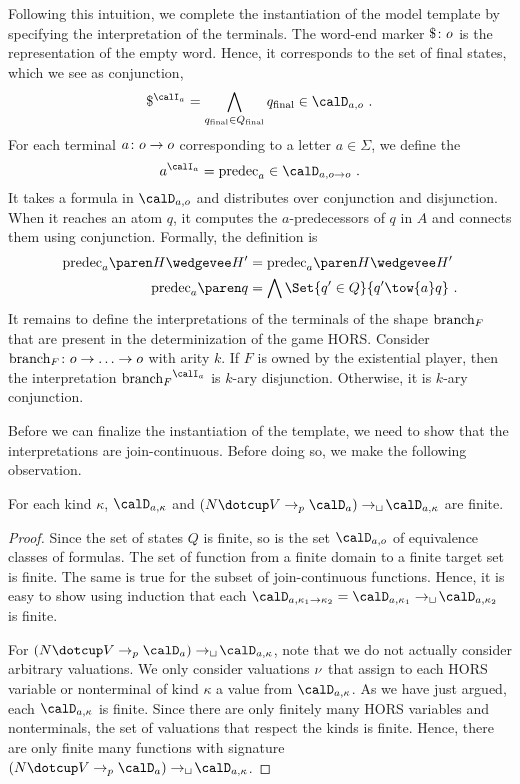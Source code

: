 \documentclass[../../diss.tex]{subfiles}
\begin{document}
Following this intuition, we complete the instantiation of the model template by specifying the interpretation of the terminals.
The word-end marker $\$ \colon o$ is the representation of the empty word.
Hence, it corresponds to the set of final states, which we see as conjunction,
\[
    \wordend^{\interpretationa} = \bigwedge_{\qfinal \in \QF} \qfinal \in \domaina{\ground}
    \ .
\]
For each terminal $a \colon o \to o$ corresponding to a letter $a \in \Sigma$, we define the 
\[
    a^{\interpretationa} = \predec{a} \in \domaina{\ground \to \ground}
    \ .
\]
It takes a formula in $\domaina{\ground}$ and distributes over conjunction and disjunction.
When it reaches an atom $q$, it computes the $a$-predecessors of $q$ in $A$ and connects them using conjunction.
Formally, the definition is
\begin{align*}
    \predec{a}{H \wedgevee H'} &= \predec{a}{H \wedgevee H'}
    \\
    \predec{a}{q} &= \bigwedge \Set{q' \in Q}{ q' \tow{a} q}
    \ .
\end{align*}
%
It remains to define the interpretations of the terminals of the shape $\text{branch}_F$ that are present in the determinization of the game HORS.\@
Consider $\text{branch}_F \colon o \to \ldots \to o$ with arity $k$.
If $F$ is owned by the existential player, then the interpretation ${\brancht_F}^{\interpretationa}$ is $k$-ary disjunction.
Otherwise, it is $k$-ary conjunction.

Before we can finalize the instantiation of the template, we need to show that the interpretations are join-continuous.
Before doing so, we make the following observation.

\begin{lemma}%
\label{Lemma:HORSSolvingDomainsFinite}%
    For each kind $\kappa$, $\domaina{\kappa}$ and $(N \dotcup V \pto \domaina) \cto \domaina{\kappa}$ are finite.
\end{lemma}

\begin{proof}
    Since the set of states $Q$ is finite, so is the set $\domaina{\ground}$ of equivalence classes of formulas.
    The set of function from a finite domain to a finite target set is finite.
    The same is true for the subset of join-continuous functions.
    Hence, it is easy to show using induction that each $\domaina{\kappa_1 \to \kappa_2} = \domaina{\kappa_1} \cto \domaina{\kappa_2}$ is finite.

    For $(N \dotcup V \pto \domaina) \cto \domaina{\kappa}$, note that we do not actually consider arbitrary valuations.
    We only consider valuations $\nu$ that assign to each HORS variable or nonterminal of kind $\kappa$ a value from $\domaina{\kappa}$.
    As we have just argued, each $\domaina{\kappa}$ is finite.
    Since there are only finitely many HORS variables and nonterminals, the set of valuations that respect the kinds is finite.
    Hence, there are only finite many functions with signature $(N \dotcup V \pto \domaina) \cto \domaina{\kappa}$.
\end{proof}
\end{document}
